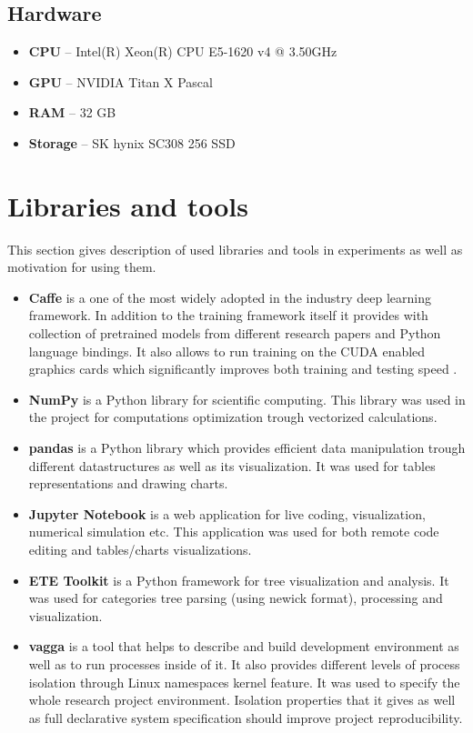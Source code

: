     \subsection{Hardware}
    \label{sec:main-hw}
    \begin{itemize}
        \item \textbf{CPU} -- Intel(R) Xeon(R) CPU E5-1620 v4 @ 3.50GHz
        \item \textbf{GPU} -- NVIDIA Titan X Pascal
        \item \textbf{RAM} -- 32 GB
        \item \textbf{Storage} -- SK hynix SC308 256 SSD
    \end{itemize}

    
\section{Libraries and tools}
This section gives description of used libraries and tools in experiments as well as motivation for using them.

\begin{itemize}
    \item \textbf{Caffe} \cite{Caffe} is a one of the most widely adopted in the industry deep learning framework. In addition to the training framework itself it provides with collection of pretrained models from different research papers \cite{CaffeModelZoo} and Python language bindings. It also allows to run training on the CUDA \cite{CUDA} enabled graphics cards which significantly improves both training and testing speed \cite{Krizhevsky2012ImageNetDNN}.
    \item \textbf{NumPy} \cite{numpy} is a Python library for scientific computing. This library was used in the project for computations optimization trough vectorized calculations.
    \item \textbf{pandas} \cite{pandas} is a Python library which provides efficient data manipulation trough different datastructures as well as its visualization. It was used for tables representations and drawing charts.
    \item \textbf{Jupyter Notebook} \cite{jupyter} is a web application for live coding, visualization, numerical simulation etc. This application was used for both remote code editing and tables/charts visualizations.
    \item \textbf{ETE Toolkit} \cite{ete3} is a Python framework for tree visualization and analysis. It was used for categories tree parsing (using newick \cite{newick} format), processing and visualization.
    \item \textbf{vagga} \cite{vagga} is a tool that helps to describe and build development environment as well as to run processes inside of it. It also provides different levels of process isolation through Linux namespaces \cite{namespaces} kernel feature. It was used to specify the whole research project environment. Isolation properties that it gives as well as full declarative system specification should improve project reproducibility.
\end{itemize}
